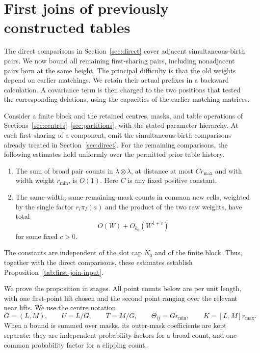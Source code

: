\section{First joins of previously constructed tables}\label{sec:joins}

The direct comparisons in Section~\ref{sec:direct} cover adjacent
simultaneous-birth pairs. We now bound all remaining first-sharing pairs,
including nonadjacent pairs born at the same height. The principal difficulty is that the old
weights depend on earlier matchings. We retain their actual prefixes in a
backward calculation. A covariance term is then charged to the two
positions that tested the corresponding deletions, using the capacities
of the earlier matching matrices.

\begin{proposition}
\label{join:remaining-first-joins}
Consider a finite block and the retained centres, masks, and table
operations of Sections~\ref{sec:centres}--\ref{sec:partitions}, with the
stated parameter hierarchy. At each first sharing of a component, omit
the simultaneous-birth comparisons already treated in
Section~\ref{sec:direct}. For the remaining comparisons, the following
estimates hold uniformly over the permitted prior table history.
\begin{enumerate}
\item The sum of broad pair counts in $\lambda\otimes\lambda$, at
distance at most $C r_{\max}$ and with width weight $r_{\min}$, is $O(1)$.
Here $C$ is any fixed positive constant.
\item The same-width, same-remaining-mask counts in common new cells,
weighted by the single factor $r_i\pi_I(a)$ and the product of the two
raw weights, have total
\[
 O(W)+O_{k_0}(W^{1+c})
\]
for some fixed $c>0$.
\end{enumerate}
The constants are independent of the slot cap $N_0$ and of the finite
block. Thus, together with the direct comparisons, these estimates
establish Proposition~\ref{tab:first-join-input}.
\end{proposition}

We prove the proposition in stages. All point counts below are per unit
length, with one first-point lift chosen and the second point ranging
over the relevant near lifts. We use the centre notation
\[
 G=(L,M),\qquad U=L/G,\qquad T=M/G,\qquad
 \Theta_{ij}=G r_{\min},\qquad K=[L,M]r_{\max}.
\]
When a bound is summed over masks, its outer-mask coefficients are kept
separate: they are independent probability factors for a broad count,
and one common probability factor for a clipping count.

